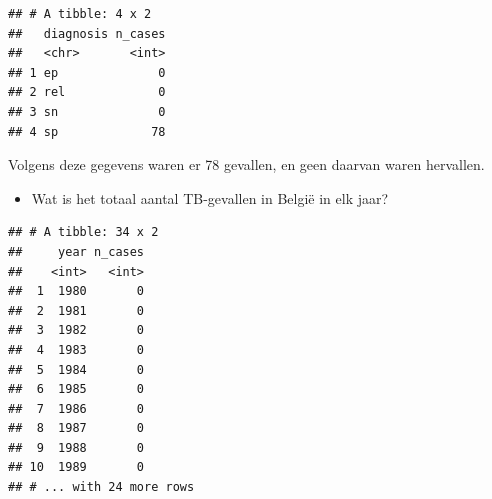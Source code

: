 \documentclass[]{tufte-book}
\newenvironment{Shaded}{}{}
\newcommand{\DataTypeTok}[1]{\textcolor[rgb]{0.56,0.13,0.00}{#1}}
\newcommand{\DecValTok}[1]{\textcolor[rgb]{0.25,0.63,0.44}{#1}}
\newcommand{\KeywordTok}[1]{\textcolor[rgb]{0.00,0.44,0.13}{\textbf{#1}}}
\newcommand{\NormalTok}[1]{#1}
\newcommand{\OperatorTok}[1]{\textcolor[rgb]{0.40,0.40,0.40}{#1}}
\newcommand{\StringTok}[1]{\textcolor[rgb]{0.25,0.44,0.63}{#1}}
\providecommand{\tightlist}{%
  \setlength{\itemsep}{0pt}\setlength{\parskip}{0pt}}
\begin{document}
\begin{Shaded}
\end{Shaded}

\begin{verbatim}
## # A tibble: 4 x 2
##   diagnosis n_cases
##   <chr>       <int>
## 1 ep              0
## 2 rel             0
## 3 sn              0
## 4 sp             78
\end{verbatim}

Volgens deze gegevens waren er 78 gevallen, en geen daarvan waren hervallen.

\begin{itemize}
\tightlist
\item
  Wat is het totaal aantal TB-gevallen in België in elk jaar?
\end{itemize}

\begin{Shaded}
\end{Shaded}

\begin{verbatim}
## # A tibble: 34 x 2
##     year n_cases
##    <int>   <int>
##  1  1980       0
##  2  1981       0
##  3  1982       0
##  4  1983       0
##  5  1984       0
##  6  1985       0
##  7  1986       0
##  8  1987       0
##  9  1988       0
## 10  1989       0
## # ... with 24 more rows
\end{verbatim}
\end{document}
